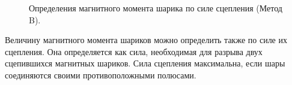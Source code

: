 \documentclass[a4paper, 12pt]{article}
\begin{document}
\begin{figure}
\caption{Определения магнитного момента шарика по силе сцепления (Метод B).}
\label{ris:image}
\end{figure}
Величину магнитного момента шариков можно определить также по силе их сцепления. Она определяется как сила, необходимая для разрыва двух сцепившихся магнитных шариков. Сила сцепления максимальна, если шары соединяются своими противоположными полюсами.
\end{document}
